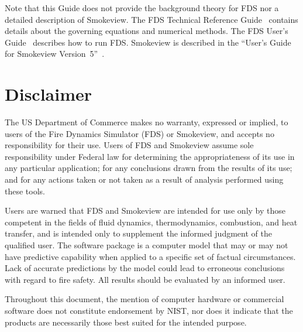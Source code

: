 \documentclass[11pt]{book}
\begin{document}
Note that this Guide does not provide the background theory for FDS nor a detailed description of Smokeview. The FDS
Technical Reference Guide~\cite{FDS_Math_Guide_5} contains details about the governing
equations and numerical methods. The FDS User's Guide~\cite{FDS_Users_Guide_5} describes how to run FDS. Smokeview is described in the ``User's Guide for
Smokeview Version~5''~\cite{Smokeview_Users_Guide_5}.


\chapter{Disclaimer}

The US Department of Commerce makes no warranty, expressed or implied, to
users of the Fire Dynamics Simulator (FDS) or Smokeview, and accepts no responsibility for their
use. Users of FDS and Smokeview assume sole responsibility under Federal law for
determining the appropriateness of its use in any particular application;
for any conclusions drawn from the results of its use; and for any actions
taken or not taken as a result of analysis performed using these tools.

Users are warned that FDS and Smokeview are intended for use only by those competent in
the fields of fluid dynamics, thermodynamics, combustion, and heat transfer,
and is intended only to supplement the
informed judgment of the qualified user. The software package is a
computer model that may or may not have predictive capability when applied
to a specific set of factual circumstances. Lack of accurate predictions by
the model could lead to erroneous conclusions with regard to fire safety.
All results should be evaluated by an informed user.

Throughout this document, the mention of computer hardware or
commercial software does not constitute endorsement by NIST, nor does
it indicate that the products are necessarily those best suited for the
intended purpose.

\tableofcontents
\listoffigures

\mainmatter

\end{document}
